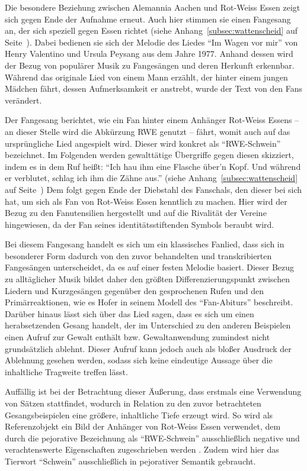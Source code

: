 Die besondere Beziehung zwischen Alemannia Aachen und Rot-Weiss Essen zeigt sich gegen Ende der Aufnahme erneut.
Auch hier stimmen sie einen Fangesang an, der sich speziell gegen Essen richtet (siehe Anhang~\ref{subsec:wattenscheid} auf Seite~\pageref{subsec:wattenscheid}).
Dabei bedienen sie sich der Melodie des Liedes "`Im Wagen vor mir"' von Henry Valentino und Ursula Peysang aus dem Jahre 1977.
Anhand dessen wird der Bezug von populärer Musik zu Fangesängen und deren Herkunft erkennbar.
Während das originale Lied von einem Mann erzählt, der hinter einem jungen Mädchen fährt, dessen Aufmerksamkeit er anstrebt, wurde der Text von den Fans verändert.

Der Fangesang berichtet, wie ein Fan hinter einem Anhänger Rot-Weiss Essens – an dieser Stelle wird die Abkürzung RWE genutzt – fährt, womit auch auf das ursprüngliche Lied angespielt wird.
Dieser wird konkret als "`RWE-Schwein"' bezeichnet.
Im Folgenden werden gewalttätige Übergriffe gegen diesen skizziert, indem es in dem Ruf heißt:
"`Ich hau ihm eine Flasche über'n Kopf.
Und während er verblutet, schlag ich ihm die Zähne aus."' (siehe Anhang~\ref{subsec:wattenscheid} auf Seite~\pageref{subsec:wattenscheid})
Dem folgt gegen Ende der Diebstahl des Fanschals, den dieser bei sich hat, um sich als Fan von Rot-Weiss Essen kenntlich zu machen.
Hier wird der Bezug zu den Fanutensilien hergestellt und auf die Rivalität der Vereine hingewiesen, da der Fan seines identitätsstiftenden Symbols beraubt wird.

Bei diesem Fangesang handelt es sich um ein klassisches Fanlied, dass sich in besonderer Form dadurch von den zuvor behandelten und transkribierten Fangesängen unterscheidet, da es auf einer festen Melodie basiert.
Dieser Bezug zu alltäglicher Musik bildet daher den größten Differenzierungspunkt zwischen Liedern und Kurzgesängen gegenüber den gesprochenen Rufen und den Primärreaktionen, wie es Hofer in seinem Modell des "`Fan-Abiturs"' beschreibt\cite[S. 15]{RK98}.
Darüber hinaus lässt sich über das Lied sagen, dass es sich um einen herabsetzenden Gesang handelt, der im Unterschied zu den anderen Beispielen einen Aufruf zur Gewalt enthält bzw. Gewaltanwendung zumindest nicht grundsätzlich ablehnt.
Dieser Aufruf kann jedoch auch als bloßer Ausdruck der Ablehnung gesehen werden, sodass sich keine eindeutige Aussage über die inhaltliche Tragweite treffen lässt.

Auffällig ist bei der Betrachtung dieser Äußerung, dass erstmals eine Verwendung von Sätzen stattfindet, wodurch in Relation zu den zuvor betrachteten Gesangsbeispielen eine größere, inhaltliche Tiefe erzeugt wird.
So wird als Referenzobjekt ein Bild der Anhänger von Rot-Weiss Essen verwendet, dem durch die pejorative Bezeichnung als "`RWE-Schwein"' ausschließlich negative und verachtenswerte Eigenschaften zugeschrieben werden \cite{Dud15}.
Zudem wird hier das Tierwort "`Schwein"' ausschließlich in pejorativer Semantik gebraucht.

